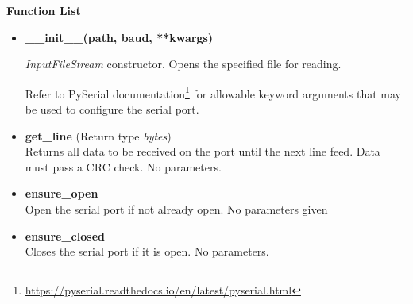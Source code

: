 \textbf{Function List}
\begin{itemize}
	
	\item \textbf{\_\_init\_\_(path, baud, **kwargs)}

	\emph{InputFileStream} constructor. Opens the specified file for reading.


	Refer to PySerial documentation\footnote{\url{https://pyserial.readthedocs.io/en/latest/pyserial.html}}
	for allowable keyword arguments that may be used to configure the serial port.

	\item \textbf{get\_line} (Return type \emph{bytes}) \\
	Returns all data to be received on the port until the next line feed. Data must pass a CRC check. No parameters.

	\item \textbf{ensure\_open} \\
	Open the serial port if not already open. No parameters given

	\item \textbf{ensure\_closed} \\
	Closes the serial port if it is open. No parameters.

\end{itemize}


